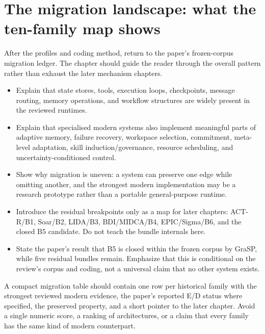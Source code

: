 \section{The migration landscape: what the ten-family map shows}
After the profiles and coding method, return to the paper's frozen-corpus migration ledger. The chapter should guide the reader through the overall pattern rather than exhaust the later mechanism chapters.
\begin{itemize}
  \item Explain that state stores, tools, execution loops, checkpoints, message routing, memory operations, and workflow structures are widely present in the reviewed runtimes.
  \item Explain that specialised modern systems also implement meaningful parts of adaptive memory, failure recovery, workspace selection, commitment, meta-level adaptation, skill induction/governance, resource scheduling, and uncertainty-conditioned control.
  \item Show why migration is uneven: a system can preserve one edge while omitting another, and the strongest modern implementation may be a research prototype rather than a portable general-purpose runtime.
  \item Introduce the residual breakpoints only as a map for later chapters: ACT-R/B1, Soar/B2, LIDA/B3, BDI/MIDCA/B4, EPIC/Sigma/B6, and the closed B5 candidate. Do not teach the bundle internals here.
  \item State the paper's result that B5 is closed within the frozen corpus by GraSP, while five residual bundles remain. Emphasize that this is conditional on the review's corpus and coding, not a universal claim that no other system exists.
\end{itemize}

A compact migration table should contain one row per historical family with the strongest reviewed modern evidence, the paper's reported E/D status where specified, the preserved property, and a short pointer to the later chapter. Avoid a single numeric score, a ranking of architectures, or a claim that every family has the same kind of modern counterpart.

